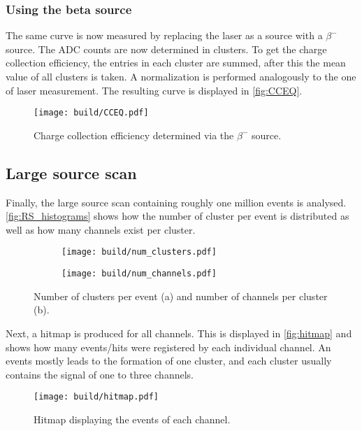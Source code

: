 \subsubsection{Using the beta source}

The same curve is now measured by replacing the laser as a source with a $\beta^-$ source.
The ADC counts are now determined in clusters. To get the charge collection efficiency,
the entries in each cluster are summed, after this the mean value of all clusters is taken.
A normalization is performed analogously to the one of laser measurement.
The resulting curve is displayed in \autoref{fig:CCEQ}.

\begin{figure}[H]
  \centering
  \texttt{[image: build/CCEQ.pdf]}
  \caption{Charge collection efficiency determined via the $\beta^-$ source.}
  \label{fig:CCEQ}
\end{figure}

\subsection{Large source scan}

Finally, the large source scan containing roughly one million events is analysed.
\autoref{fig:RS_histograms} shows how the number of cluster per event is distributed
as well as how many channels exist per cluster.

\begin{figure}[H]
  \centering
    \begin{subfigure}{0.45\textwidth}
      \texttt{[image: build/num\_clusters.pdf]}
      \caption{}
    \end{subfigure}
    \begin{subfigure}{0.45\textwidth}
      \texttt{[image: build/num\_channels.pdf]}
      \caption{}
    \end{subfigure}
  \caption{Number of clusters per event (a) and number of channels per cluster (b).}
  \label{fig:RS_histograms}
\end{figure}

Next, a hitmap is produced for all channels. This is displayed in
\autoref{fig:hitmap} and shows how many events/hits were registered by each
individual channel. An events mostly leads to the formation of one cluster,
and each cluster usually contains the signal of one to three channels.

\begin{figure}[H]
  \centering
  \texttt{[image: build/hitmap.pdf]}
  \caption{Hitmap displaying the events of each channel.}
  \label{fig:hitmap}
\end{figure}


